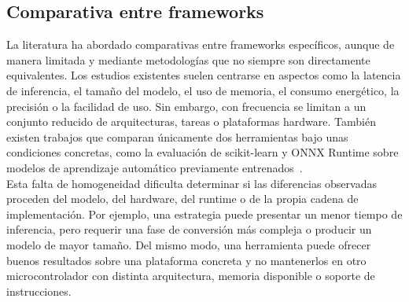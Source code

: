 \documentclass[a4paper,12pt,twoside,final]{book}
\begin{document}
\subsection{Comparativa entre frameworks}
La literatura ha abordado comparativas entre frameworks específicos, aunque de manera limitada y mediante
metodologías que no siempre son directamente equivalentes. Los estudios existentes suelen centrarse en aspectos como
la latencia de inferencia, el tamaño del modelo, el uso de memoria, el consumo energético, la precisión o la
facilidad de uso. Sin embargo, con frecuencia se limitan a un conjunto reducido de arquitecturas, tareas o
plataformas hardware. También existen trabajos que comparan únicamente dos herramientas bajo unas condiciones
concretas, como la evaluación de scikit-learn y ONNX Runtime sobre modelos de aprendizaje automático previamente
entrenados~\cite{vicente2023fedcsis}.\\

Esta falta de homogeneidad dificulta determinar si las diferencias observadas proceden del modelo, del hardware, del
runtime o de la propia cadena de implementación. Por ejemplo, una estrategia puede presentar un menor tiempo de
inferencia, pero requerir una fase de conversión más compleja o producir un modelo de mayor tamaño. Del mismo modo,
una herramienta puede ofrecer buenos resultados sobre una plataforma concreta y no mantenerlos en otro
microcontrolador con distinta arquitectura, memoria disponible o soporte de instrucciones.\\
\end{document}
